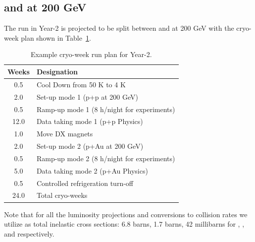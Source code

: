 \subsection{\pp and \pau at 200 GeV}

The run in Year-2 is projected to be split between \pp and \pau at 200 GeV 
with the cryo-week plan shown in Table~\ref{tab:cryo2023}.

\begin{table}
\centering
\begin{tabular}{ | c | l | }
\hline
Weeks & Designation \\ \hline
0.5  & Cool Down from 50 K to 4 K \\ \hline
2.0  & Set-up mode 1 (p+p at 200 GeV) \\ \hline
0.5  & Ramp-up mode 1 (8 h/night for experiments) \\ \hline
12.0 & Data taking mode 1 (p+p Physics) \\ \hline
1.0  & Move DX magnets \\ \hline
2.0  & Set-up mode 2 (p+Au at 200 GeV) \\ \hline
0.5  & Ramp-up mode 2 (8 h/night for experiments) \\ \hline
5.0 & Data taking mode 2 (p+Au Physics) \\ \hline
0.5  & Controlled refrigeration turn-off \\ \hline \hline \hline
24.0 & Total cryo-weeks \\
\hline
\end{tabular}
\caption{Example cryo-week run plan for Year-2.\label{tab:cryo2023}}
\end{table}

Note that for all the luminosity projections and conversions to collision rates we utilize as total inelastic cross sections: 
6.8 barns, 1.7 barns, 42 millibarns for \auau, \pau, and \pp respectively.

